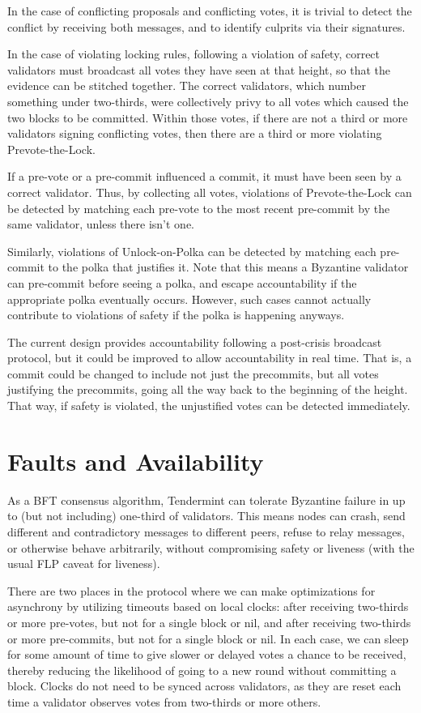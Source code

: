 In the case of conflicting proposals and conflicting votes,
it is trivial to detect the conflict by receiving both messages,
and to identify culprits via their signatures.

In the case of violating locking rules, following a violation of safety,
correct validators must broadcast all votes they have seen at that height, 
so that the evidence can be stitched together.
The correct validators, which number something under two-thirds, 
were collectively privy to all votes which caused the two blocks to be committed.
Within those votes, if there are not a third or more validators signing conflicting votes,
then there are a third or more violating Prevote-the-Lock.

If a pre-vote or a pre-commit influenced a commit, it must have been seen by a correct validator.
Thus, by collecting all votes, violations of Prevote-the-Lock can be detected
by matching each pre-vote to the most recent pre-commit by the same validator, unless there isn't one.

Similarly, violations of Unlock-on-Polka can be detected by matching each pre-commit
to the polka that justifies it. 
Note that this means a Byzantine validator can pre-commit before seeing a polka,
and escape accountability if the appropriate polka eventually occurs.
However, such cases cannot actually contribute to violations of safety 
if the polka is happening anyways.

The current design provides accountability following a post-crisis broadcast protocol,
but it could be improved to allow accountability in real time. 
That is, a commit could be changed to include not just the precommits, but all votes 
justifying the precommits, going all the way back to the beginning of the height.
That way, if safety is violated, the unjustified votes can be detected immediately.

\section{Faults and Availability}

As a BFT consensus algorithm, Tendermint can tolerate Byzantine failure in up to 
(but not including) one-third of validators.
This means nodes can crash, send different and contradictory messages to different peers, 
refuse to relay messages, or otherwise behave arbitrarily,
without compromising safety or liveness (with the usual FLP caveat for liveness).

There are two places in the protocol where we can make optimizations 
for asynchrony by utilizing timeouts based on local clocks:
after receiving two-thirds or more pre-votes, but not for a single block or nil, 
and after receiving two-thirds or more pre-commits, 
but not for a single block or nil.
In each case, we can sleep for some amount of time to give slower or delayed votes a chance to be received,
thereby reducing the likelihood of going to a new round without committing a block.
Clocks do not need to be synced across validators, 
as they are reset each time a validator observes votes from two-thirds or more others.

